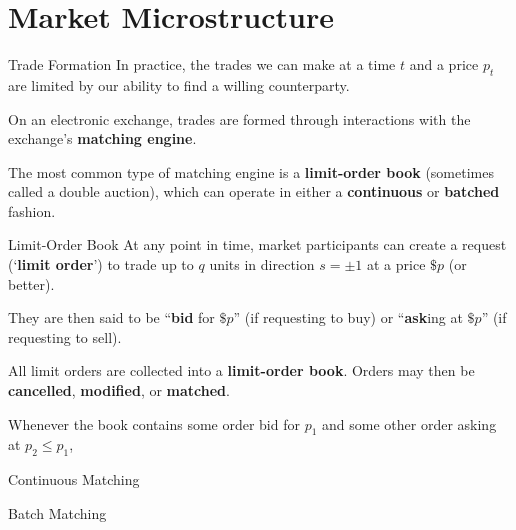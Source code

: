 \documentclass{beamer}
\begin{document}
\section{Market Microstructure}
\begin{frame}{Trade Formation}
	In practice, the trades we can make at a time $t$ and a price $p_t$ are limited by our ability to find a willing counterparty.

	On an electronic exchange, trades are formed through interactions with the exchange's \textbf{matching engine}.%

	The most common type of matching engine is a \textbf{limit-order book} (sometimes called a double auction), which can operate in either a \textbf{continuous} or \textbf{batched} fashion.

	\pause
	
	\begin{block}{Limit-Order Book} %
		At any point in time, market participants can create a request (`\textbf{limit order}') to trade up to $q$ units in direction $s=\pm1$ at a price $\$p$ (or better). %
		
		They are then said to be ``\textbf{bid} for $\$p$'' (if requesting to buy) or ``\textbf{ask}ing at $\$p$'' (if requesting to sell). %

		All limit orders are collected into a \textbf{limit-order book}. Orders may then be \textbf{cancelled}, \textbf{modified}, or \textbf{matched}. %

		Whenever the book contains some order bid for $p_1$ and some other order asking at $p_2\leq p_1$, 
	\end{block}
	\begin{block}{Continuous Matching}
	\end{block} %

	\begin{block}{Batch Matching}
		
	\end{block} %
\end{frame}
\end{document}
